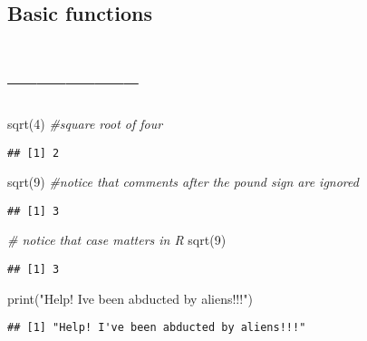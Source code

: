 \documentclass[
]{article}
\newenvironment{Shaded}{\begin{snugshade}}{\end{snugshade}}
\newcommand{\CommentTok}[1]{\textcolor[rgb]{0.56,0.35,0.01}{\textit{#1}}}
\newcommand{\DecValTok}[1]{\textcolor[rgb]{0.00,0.00,0.81}{#1}}
\newcommand{\FunctionTok}[1]{\textcolor[rgb]{0.00,0.00,0.00}{#1}}
\newcommand{\NormalTok}[1]{#1}
\newcommand{\StringTok}[1]{\textcolor[rgb]{0.31,0.60,0.02}{#1}}
\begin{document}
\hypertarget{basic-functions}{%
\subsection{Basic functions}\label{basic-functions}}

\hypertarget{section-5}{%
\section{--------------}\label{section-5}}

\begin{Shaded}
\begin{Highlighting}[]
\FunctionTok{sqrt}\NormalTok{(}\DecValTok{4}\NormalTok{)   }\CommentTok{\#square root of four}
\end{Highlighting}
\end{Shaded}

\begin{verbatim}
## [1] 2
\end{verbatim}

\begin{Shaded}
\begin{Highlighting}[]
\FunctionTok{sqrt}\NormalTok{(}\DecValTok{9}\NormalTok{)   }\CommentTok{\#notice that comments after the pound sign are ignored}
\end{Highlighting}
\end{Shaded}

\begin{verbatim}
## [1] 3
\end{verbatim}

\begin{Shaded}
\begin{Highlighting}[]
\CommentTok{\# notice that case matters in R}
\FunctionTok{sqrt}\NormalTok{(}\DecValTok{9}\NormalTok{)}
\end{Highlighting}
\end{Shaded}

\begin{verbatim}
## [1] 3
\end{verbatim}

\begin{Shaded}
\begin{Highlighting}[]
\FunctionTok{print}\NormalTok{(}\StringTok{"Help! I\textquotesingle{}ve been abducted by aliens!!!"}\NormalTok{)}
\end{Highlighting}
\end{Shaded}

\begin{verbatim}
## [1] "Help! I've been abducted by aliens!!!"
\end{verbatim}
\end{document}
